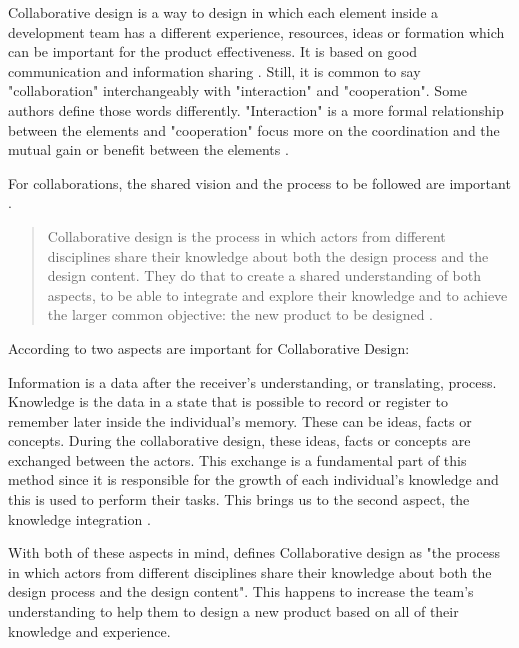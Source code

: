 Collaborative design is a way to design in which each element inside a development team has a different experience, resources, ideas or formation which can be important for the product effectiveness. It is based on good communication and information sharing \cite{chiu2002organizational}. Still, it is common to say "collaboration" interchangeably with "interaction" and "cooperation". Some authors define those words differently. "Interaction" is a more formal relationship between the elements \cite{kahn1996interdepartmental} and "cooperation" focus more on the coordination and the mutual gain or benefit between the elements \cite{smith1996top}.

For collaborations, the shared vision and the process to be followed are important \cite{kleinsmann2006understanding}.

\begin{quote}
    Collaborative design is the process in which actors from different disciplines share their knowledge about both the design process and the design content. They do that to create a shared understanding of both aspects, to be able to integrate and explore their knowledge and to achieve the larger common objective: the new product to be designed \cite{kleinsmann2006understanding}.
\end{quote}

According to  two aspects are important for Collaborative Design:

Information is a data after the receiver's understanding, or translating, process. Knowledge is the data in a state that is possible to record or register to remember later inside the individual's memory. These can be ideas, facts or concepts. During the collaborative design, these ideas, facts or concepts are exchanged between the actors. This exchange is a fundamental part of this method since it is responsible for the growth of each individual's knowledge and this is used to perform their tasks. This brings us to the second aspect, the knowledge integration \cite{kleinsmann2006understanding}.

With both of these aspects in mind,  defines Collaborative design as "the process in which actors from different disciplines share their knowledge about both the design process and the design content". This happens to increase the team's understanding to help them to design a new product based on all of their knowledge and experience.